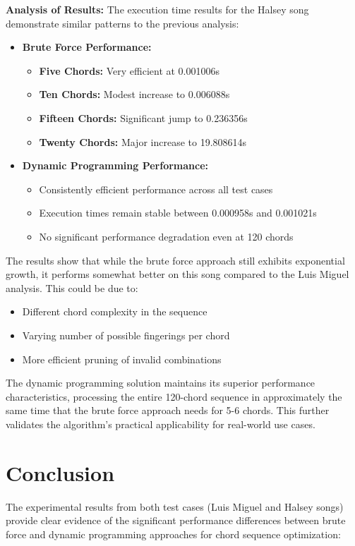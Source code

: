 \documentclass[conference]{IEEEtran}
\begin{document}
\textbf{Analysis of Results:}
The execution time results for the Halsey song demonstrate similar patterns to the previous analysis:

\begin{itemize}
    \item \textbf{Brute Force Performance:}
    \begin{itemize}
        \item \textbf{Five Chords:} Very efficient at 0.001006s
        \item \textbf{Ten Chords:} Modest increase to 0.006088s
        \item \textbf{Fifteen Chords:} Significant jump to 0.236356s
        \item \textbf{Twenty Chords:} Major increase to 19.808614s
    \end{itemize}
    
    \item \textbf{Dynamic Programming Performance:}
    \begin{itemize}
        \item Consistently efficient performance across all test cases
        \item Execution times remain stable between 0.000958s and 0.001021s
        \item No significant performance degradation even at 120 chords
    \end{itemize}
\end{itemize}

The results show that while the brute force approach still exhibits exponential growth, it performs somewhat better on this song compared to the Luis Miguel analysis. This could be due to:

\begin{itemize}
    \item Different chord complexity in the sequence
    \item Varying number of possible fingerings per chord
    \item More efficient pruning of invalid combinations
\end{itemize}

The dynamic programming solution maintains its superior performance characteristics, processing the entire 120-chord sequence in approximately the same time that the brute force approach needs for 5-6 chords. This further validates the algorithm's practical applicability for real-world use cases.

\section{Conclusion}
The experimental results from both test cases (Luis Miguel and Halsey songs) provide clear evidence of the significant performance differences between brute force and dynamic programming approaches for chord sequence optimization:
\end{document}
